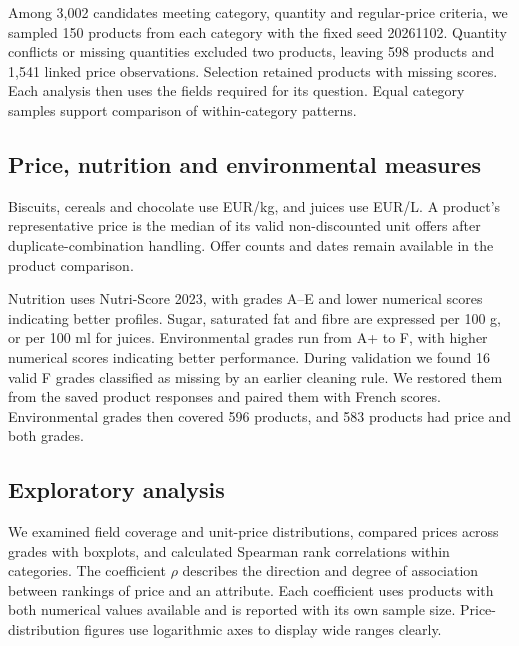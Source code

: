 \documentclass[11pt,a4paper,onecolumn,oneside]{tau-class/tau}
\begin{document}
Among 3,002 candidates meeting category, quantity and regular-price criteria, we sampled 150 products from each category with the fixed seed 20261102. Quantity conflicts or missing quantities excluded two products, leaving 598 products and 1,541 linked price observations. Selection retained products with missing scores. Each analysis then uses the fields required for its question. Equal category samples support comparison of within-category patterns.
\begin{table}[!ht]\centering\small\caption{Product counts, category median prices and grade coverage. Each product receives equal weight in the category summaries.}\label{tab:sample}\end{table}

\subsection{Price, nutrition and environmental measures}
Biscuits, cereals and chocolate use EUR/kg, and juices use EUR/L. A product's representative price is the median of its valid non-discounted unit offers after duplicate-combination handling. Offer counts and dates remain available in the product comparison.

Nutrition uses Nutri-Score 2023, with grades A--E and lower numerical scores indicating better profiles. Sugar, saturated fat and fibre are expressed per 100 g, or per 100 ml for juices. Environmental grades run from A+ to F, with higher numerical scores indicating better performance. During validation we found 16 valid F grades classified as missing by an earlier cleaning rule. We restored them from the saved product responses and paired them with French scores. Environmental grades then covered 596 products, and 583 products had price and both grades.

\subsection{Exploratory analysis}
We examined field coverage and unit-price distributions, compared prices across grades with boxplots, and calculated Spearman rank correlations within categories. The coefficient $\rho$ describes the direction and degree of association between rankings of price and an attribute. Each coefficient uses products with both numerical values available and is reported with its own sample size. Price-distribution figures use logarithmic axes to display wide ranges clearly.
\end{document}
